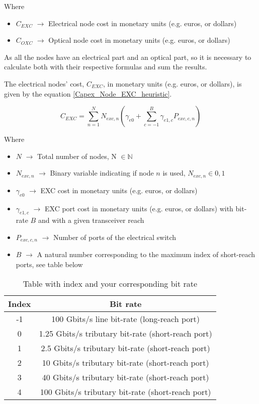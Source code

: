 Where

\begin{itemize}
\item {$C_{EXC}$        $\rightarrow$   Electrical node cost in monetary units (e.g. euros, or dollars)}
\item {$C_{OXC}$        $\rightarrow$   Optical node cost in monetary units (e.g. euros, or dollars)}
\end{itemize}

\vspace{11pt}
As all the nodes have an electrical part and an optical part, so it is necessary to calculate both with their respective formulas and sum the results.

The electrical nodes' cost, $C_{EXC}$, in monetary units (e.g. euros, or dollars), is given by the equation \ref{Capex_Node_EXC_heuristic}.

\begin{equation}
C_{EXC} = \sum_{n=1}^{N} N_{exc,n} \left( \gamma_{e0} + \sum_{c=-1}^B \gamma_{e1,c} P_{exc,c,n} \right)
\label{Capex_Node_EXC_heuristic}
\end{equation}

Where

\begin{itemize}
\item{$N$				$\rightarrow$	Total number of nodes, N $\in \mathbb{N}$}
\item{$N_{exc,n}$		$\rightarrow$	Binary variable indicating if node $n$ is used, $N_{exc,n} \in {0, 1}$}
\item{$\gamma_{e0}$ 	$\rightarrow$	EXC cost in monetary units (e.g. euros, or dollars)}
\item{$\gamma_{e1,c}$	$\rightarrow$	EXC port cost in monetary units (e.g. euros, or dollars) with bit-rate $B$ and with a given transceiver reach}
\item{$P_{exc,c,n}$	    $\rightarrow$	Number of ports of the electrical switch}
\item{$B$           	$\rightarrow$	A natural number corresponding to the maximum index of short-reach ports, see table below}
\end{itemize}

\begin{table}[H]
\centering
\begin{tabular}{|c|c|}
  \hline
  Index & Bit rate \\
 \hline\hline
  -1 & 100 Gbits/s line bit-rate (long-reach port) \\
  0 & 1.25 Gbits/s tributary bit-rate (short-reach port) \\
  1 & 2.5 Gbits/s tributary bit-rate (short-reach port) \\
  2 & 10 Gbits/s tributary bit-rate (short-reach port) \\
  3 & 40 Gbits/s tributary bit-rate (short-reach port) \\
  4 & 100 Gbits/s tributary bit-rate (short-reach port) \\
  \hline
\end{tabular}
\caption{Table with index and your corresponding bit rate}
\label{table_bitrate_heuristic}
\end{table}

